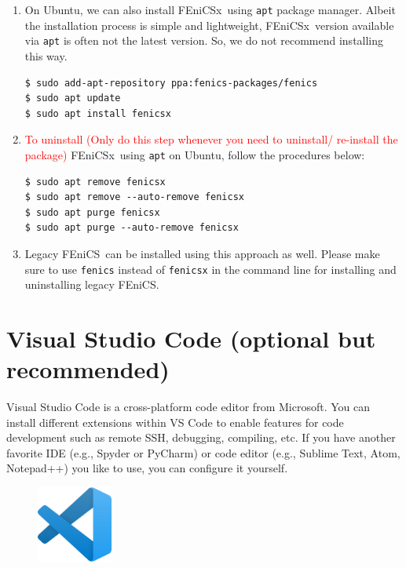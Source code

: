 \documentclass[12pt]{article}
\newcommand{\fenics}{\textsf{FEniCS}}
\newcommand{\fenicsx}{\textsf{FEniCSx}}
\begin{document}
\begin{enumerate}[label={\arabic*.}, leftmargin= 0.6 cm,itemsep = 0.2cm,topsep=.2cm, parsep=0.2cm]

\item On Ubuntu, we can also install \fenicsx \ using \texttt{apt} package manager. Albeit the installation process is simple and lightweight, \fenicsx \ version available via \texttt{apt} is often not the latest version. So, we do not recommend installing this way. 

\begin{lstlisting}[style=terminal]
$ sudo add-apt-repository ppa:fenics-packages/fenics
$ sudo apt update
$ sudo apt install fenicsx
\end{lstlisting}

\item \textcolor{red}{To uninstall (Only do this step whenever you need to uninstall/ re-install the package)} \fenicsx \ using \texttt{apt} on Ubuntu, follow the procedures below:

\begin{lstlisting}[style=terminal]
$ sudo apt remove fenicsx
$ sudo apt remove --auto-remove fenicsx
$ sudo apt purge fenicsx
$ sudo apt purge --auto-remove fenicsx
\end{lstlisting}

\item Legacy \fenics \ can be installed using this approach as well. Please make sure to use \texttt{fenics} instead of \texttt{fenicsx} in the command line for installing and uninstalling legacy \fenics.

\end{enumerate}

\section*{Visual Studio Code (optional but recommended)} 

Visual Studio Code is a cross-platform code editor from Microsoft. You can install different extensions within VS Code to enable features for code development such as remote SSH, debugging, compiling, etc. If you have another favorite IDE (e.g., Spyder or PyCharm) or code editor (e.g., Sublime Text, Atom, Notepad++) you like to use, you can configure it yourself.

\begin{figure}[H]
    \centering
    \includegraphics[width=2.5cm]{vscode-logo.png}
\end{figure}
\end{document}
